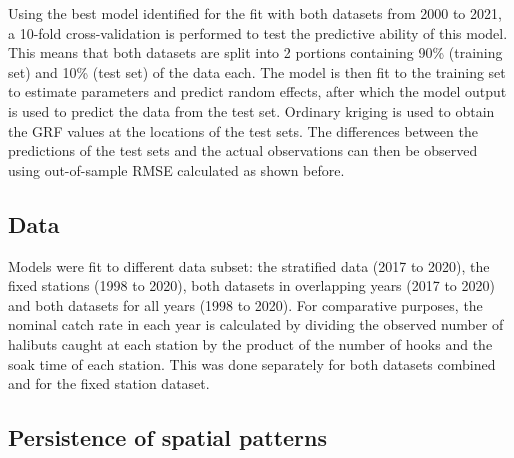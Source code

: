 \documentclass[12pt]{article}\usepackage[]{graphicx}\usepackage[]{color}
\begin{document}
Using the best model identified for the fit with both datasets from 2000 to 2021, a 10-fold cross-validation is performed to test the predictive ability of this model. This means that both datasets are split into 2 portions containing 90\% (training set) and 10\% (test set) of the data each. The model is then fit to the training set to estimate parameters and predict random effects, after which the model output is used to predict the data from the test set. Ordinary kriging is used to obtain the GRF values at the locations of the test sets. The differences between the predictions of the test sets and the actual observations can then be observed using out-of-sample RMSE calculated as shown before.

\hypertarget{data}{%
\subsection{Data}\label{data}}

Models were fit to different data subset: the stratified data (2017 to 2020), the fixed stations (1998 to 2020), both datasets in overlapping years (2017 to 2020) and both datasets for all years (1998 to 2020). For comparative purposes, the nominal catch rate in each year is calculated by dividing the observed number of halibuts caught at each station by the product of the number of hooks and the soak time of each station. This was done separately for both datasets combined and for the fixed station dataset.

\hypertarget{persistence-of-spatial-patterns}{%
\subsection{Persistence of spatial patterns}\label{persistence-of-spatial-patterns}}
\end{document}
